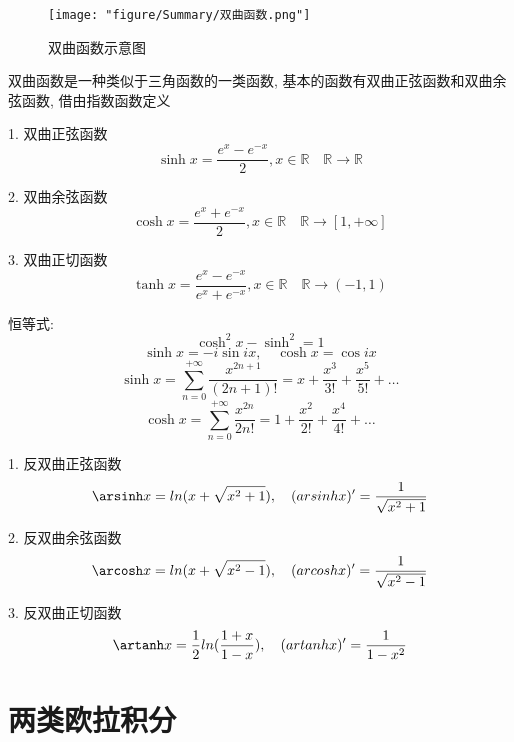 \begin{figure}[htbp]
	\centering
	\texttt{[image: "figure/Summary/双曲函数.png"]}
	\caption{双曲函数示意图}
	\label{Figure: 双曲函数示意图}
\end{figure} 
\begin{definition}[双曲函数]\label{def: 双曲函数}
	双曲函数是一种类似于三角函数的一类函数, 基本的函数有双曲正弦函数和双曲余弦函数, 借由指数函数定义
	
	1. 双曲正弦函数 
	$$\sinh x=\frac{e^{x}-e^{-x}}{2},x\in \mathbb{R}\quad \mathbb{R}\rightarrow \mathbb{R}$$
	
	2. 双曲余弦函数
	$$\cosh x=\frac{e^{x}+e^{-x}}{2},x\in \mathbb{R}\quad \mathbb{R}\rightarrow [1,+\infty]$$
	
	3. 双曲正切函数
	$$\tanh x=\frac{e^{x}-e^{-x}}{e^{x}+e^{-x}},x\in \mathbb{R}\quad \mathbb{R}\rightarrow (-1,1)$$
	
	恒等式:  
	$$\cosh^2 x-\sinh^2=1$$
	$$\sinh x=-i\sin ix,\quad \cosh x=\cos ix$$
	$$\sinh x=\sum\limits_{n=0}^{+\infty}\frac{x^{2n+1}}{(2n+1)!}=x+\frac{x^3}{3!}+\frac{x^5}{5!}+\dots$$
	$$\cosh x=\sum\limits_{n=0}^{+\infty}\frac{x^{2n}}{2n!}=1+\frac{x^2}{2!}+\frac{x^4}{4!}+\dots$$
\end{definition}
\begin{definition}[反双曲函数]
	1. 反双曲正弦函数
	$$\arsinh x=ln(x+\sqrt{x^2+1}),\quad (arsinh x)'=\frac{1}{\sqrt{x^2+1}}$$
	
	2. 反双曲余弦函数
	$$\arcosh x=ln(x+\sqrt{x^2-1}),\quad (arcosh x)'=\frac{1}{\sqrt{x^2-1}}$$
	
	3. 反双曲正切函数
	$$\artanh x=\frac{1}{2}ln(\frac{1+x}{1-x}),\quad (artanh x)'=\frac{1}{1-x^2}$$
\end{definition}

\section{两类欧拉积分}

